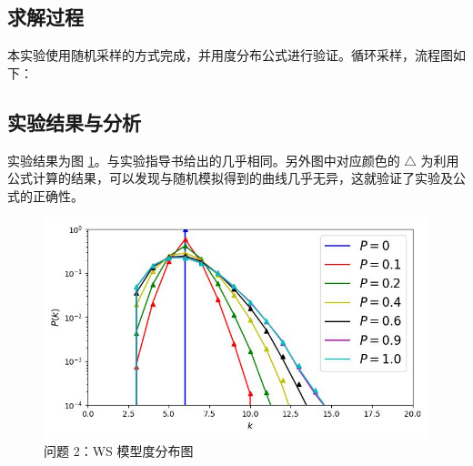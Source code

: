 \documentclass{article}
\begin{document}
\subsection{求解过程}

本实验使用随机采样的方式完成，并用度分布公式进行验证。循环采样，流程图如下：
\begin{center}
\end{center}

\subsection{实验结果与分析}

实验结果为图 \ref{fig:task2}。与实验指导书给出的几乎相同。另外图中对应颜色的 $\triangle$ 为利用公式计算的结果，可以发现与随机模拟得到的曲线几乎无异，这就验证了实验及公式的正确性。
\begin{figure}[ht]
    \label{fig:task2}
    \centering
    \includegraphics[width=.7\textwidth]{../task2.jpg}
    \caption{问题 2：WS 模型度分布图}
\end{figure}
\end{document}
